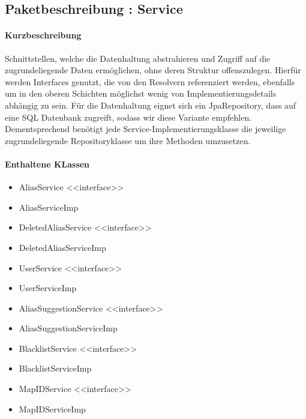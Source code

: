 \subsection{Paketbeschreibung : Service}%
\paragraph*{Kurzbeschreibung}
Schnittstellen, welche die Datenhaltung abstrahieren und Zugriff auf die zugrundeliegende Daten ermöglichen, ohne deren Struktur offenszulegen.
Hierfür werden Interfaces genutzt, die von den Resolvern referenziert werden, ebenfalls um in den oberen Schichten möglichst 
wenig von Implementierungsdetails abhängig zu sein. Für die Datenhaltung eignet sich ein JpaRepository, dass auf 
eine SQL Datenbank zugreift, sodass wir diese Variante empfehlen. Dementsprechend benötigt jede Service-Implementierungsklasse die jeweilige 
zugrundeliegende Repositoryklasse um ihre Methoden umzusetzen. 
\paragraph*{Enthaltene KLassen}
\begin{itemize}
    \item AliasService <<interface>>
    \item AliasServiceImp
    \item DeletedAliasService <<interface>>
    \item DeletedAliasServiceImp
    \item UserService <<interface>>
    \item UserServiceImp
    \item AliasSuggestionService <<interface>>
    \item AliasSuggestionServiceImp
    \item BlacklistService <<interface>>
    \item BlacklistServiceImp
    \item MapIDService <<interface>>
    \item MapIDServiceImp
\end{itemize}

